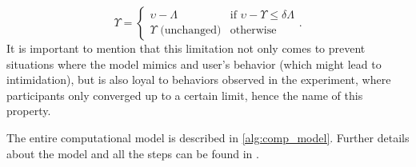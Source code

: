 \begin{equation}
\label{eq:new_value}
\Upsilon = 		
\begin{cases}
\upsilon - \Lambda & \text{if }\upsilon - \Upsilon \leq \delta\Lambda\\
\Upsilon \text{ (unchanged)} & \text{otherwise}
\end{cases}.
\end{equation}
\noindent
It is important to mention that this limitation not only comes to prevent situations where the model mimics and user's behavior (which might lead to intimidation), but is also loyal to behaviors observed in the experiment, where participants only converged up to a certain limit, hence the name of this property.

The entire computational model is described in \cref{alg:comp_model}.
Further details about the model and all the steps can be found in \citet{Raveh2017Interspeech}.

